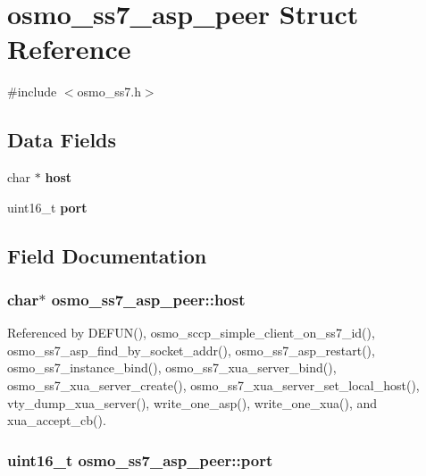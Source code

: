 \section{osmo\+\_\+ss7\+\_\+asp\+\_\+peer Struct Reference}
\label{structosmo__ss7__asp__peer}


{\ttfamily \#include $<$osmo\+\_\+ss7.\+h$>$}

\subsection*{Data Fields}
\begin{DoxyCompactItemize}
\item 
char $\ast$ {\bf host}
\item 
uint16\+\_\+t {\bf port}
\end{DoxyCompactItemize}


\subsection{Field Documentation}
\subsubsection[{host}]{\setlength{\rightskip}{0pt plus 5cm}char$\ast$ osmo\+\_\+ss7\+\_\+asp\+\_\+peer\+::host}\label{structosmo__ss7__asp__peer_a84c627853f16fc82d9f27cacd17dd46b}


Referenced by D\+E\+F\+U\+N(), osmo\+\_\+sccp\+\_\+simple\+\_\+client\+\_\+on\+\_\+ss7\+\_\+id(), osmo\+\_\+ss7\+\_\+asp\+\_\+find\+\_\+by\+\_\+socket\+\_\+addr(), osmo\+\_\+ss7\+\_\+asp\+\_\+restart(), osmo\+\_\+ss7\+\_\+instance\+\_\+bind(), osmo\+\_\+ss7\+\_\+xua\+\_\+server\+\_\+bind(), osmo\+\_\+ss7\+\_\+xua\+\_\+server\+\_\+create(), osmo\+\_\+ss7\+\_\+xua\+\_\+server\+\_\+set\+\_\+local\+\_\+host(), vty\+\_\+dump\+\_\+xua\+\_\+server(), write\+\_\+one\+\_\+asp(), write\+\_\+one\+\_\+xua(), and xua\+\_\+accept\+\_\+cb().

\subsubsection[{port}]{\setlength{\rightskip}{0pt plus 5cm}uint16\+\_\+t osmo\+\_\+ss7\+\_\+asp\+\_\+peer\+::port}\label{structosmo__ss7__asp__peer_a2746699e23e170ac193aca684d38246a}


